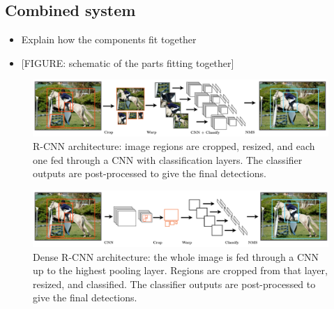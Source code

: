 \subsection{Combined system}\label{combined-system}

\begin{itemize}
\itemsep1pt\parskip0pt
\item
  Explain how the components fit together
\item
  {[}FIGURE: schematic of the parts fitting together{]}
\end{itemize}


\begin{figure}[h!]
\begin{center}
\includegraphics[width=0.98\columnwidth]{figures/rcnn.pdf}
\caption{R-CNN architecture: image regions are cropped, resized, and each one fed
through a CNN with classification layers. The classifier outputs are
post-processed to give the final detections.
}
\end{center}
\end{figure}

\begin{figure}[h!]
\begin{center}
\includegraphics[width=0.98\columnwidth]{figures/dense_rcnn.pdf}
\caption{Dense R-CNN architecture: the whole image is fed through a CNN up to the
highest pooling layer. Regions are cropped from that layer, resized, and
classified. The classifier outputs are post-processed to give the final
detections.
}
\end{center}
\end{figure}
